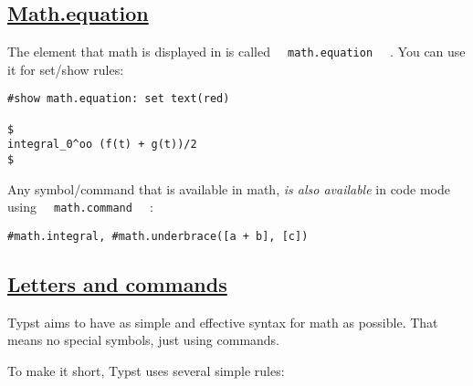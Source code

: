 \subsection{\texorpdfstring{\hyperref[mathequation]{Math.equation}}{Math.equation}}\label{mathequation}

The element that math is displayed in is called
\texttt{\ }{\texttt{\ math.equation\ }}\texttt{\ } . You can use it for
set/show rules:

\begin{verbatim}
#show math.equation: set text(red)

$
integral_0^oo (f(t) + g(t))/2
$
\end{verbatim}

\pandocbounded{}

Any symbol/command that is available in math, \emph{is also available}
in code mode using \texttt{\ }{\texttt{\ math.command\ }}\texttt{\ } :

\begin{verbatim}
#math.integral, #math.underbrace([a + b], [c])
\end{verbatim}

\pandocbounded{}

\subsection{\texorpdfstring{\hyperref[letters-and-commands]{Letters and
commands}}{Letters and commands}}\label{letters-and-commands}

Typst aims to have as simple and effective syntax for math as possible.
That means no special symbols, just using commands.

To make it short, Typst uses several simple rules:

